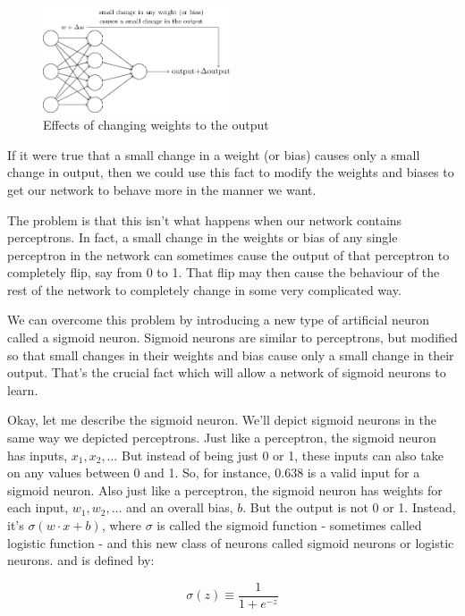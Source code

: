 \documentclass[12 pt]{article}
\begin{document}
\begin{figure}[htp]
\centering
\includegraphics[width=0.5\textwidth]{./figs/tikz8.png}
\caption{Effects of changing weights to the output}
\end{figure}

If it were true that a small change in a weight (or bias) causes only a
small change in output, then we could use this fact to modify the
weights and biases to get our network to behave more in the manner we
want.

The problem is that this isn't what happens when our network contains
perceptrons. In fact, a small change in the weights or bias of any
single perceptron in the network can sometimes cause the output of that
perceptron to completely flip, say from 0 to 1. That flip may then cause
the behaviour of the rest of the network to completely change in some
very complicated way.

We can overcome this problem by introducing a new type of artificial
neuron called a sigmoid neuron. Sigmoid neurons are similar to
perceptrons, but modified so that small changes in their weights and
bias cause only a small change in their output. That's the crucial fact
which will allow a network of sigmoid neurons to learn.

Okay, let me describe the sigmoid neuron. We'll depict sigmoid neurons
in the same way we depicted perceptrons. Just like a perceptron, the
sigmoid neuron has inputs, $ x_1, x_2, \ldots{} $ But instead of
being just 0 or 1, these inputs can also take on any values between 0
and 1. So, for instance, $ 0.638 $ is a valid input for a sigmoid
neuron. Also just like a perceptron, the sigmoid neuron has weights for
each input, $ w_1, w_2, \ldots{} $ and an overall bias, $ b
$. But the output is not 0 or 1. Instead, it's $ \sigma (w \cdot x + b)
$, where $ \sigma $ is called the sigmoid function - sometimes called
logistic function - and this new class of neurons called sigmoid neurons
or logistic neurons. and is defined by:

\begin{equation}
    \sigma(z) \equiv \frac{1}{1 + e^{-z}}
\end{equation}
\end{document}
